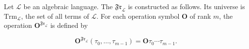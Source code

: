 Let $\mathcal{L}$ be an algebraic language. The  $\mathfrak{Fr}_\mathcal{L}$ is constructed as follows. Its universe is $\mathrm{Trm}_\mathcal{L}$, the set of all terms of $\mathcal{L}$. For each operation symbol $\mathbf{O}$ of rank $m$, the operation $\mathbf{O}^{\mathfrak{Fr}_\mathcal{L}}$ is defined by

$$\mathbf{O}^{\mathfrak{Fr}_\mathcal{L}}(\tau_0, \ldots, \tau_{m-1}) = \mathbf{O}\tau_0 \cdots \tau_{m-1}.$$
